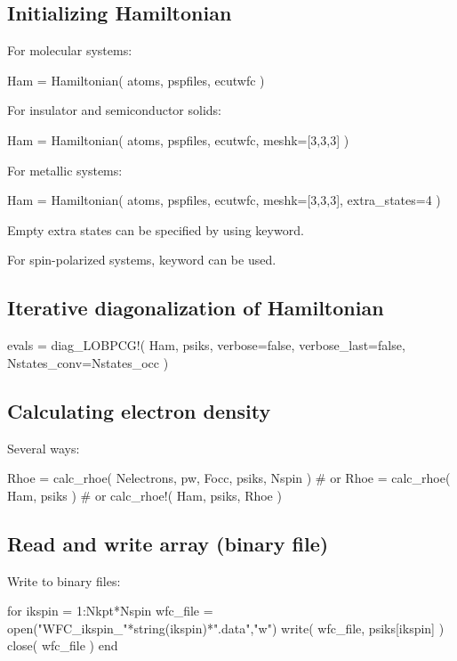 \subsection*{Initializing Hamiltonian}

For molecular systems:
\begin{juliacode}
Ham = Hamiltonian( atoms, pspfiles, ecutwfc )
\end{juliacode}

For insulator and semiconductor solids:
\begin{juliacode}
Ham = Hamiltonian( atoms, pspfiles, ecutwfc, meshk=[3,3,3] )
\end{juliacode}

For metallic systems:
\begin{juliacode}
Ham = Hamiltonian( atoms, pspfiles, ecutwfc, meshk=[3,3,3], extra_states=4 )
\end{juliacode}

Empty extra states can be specified by using  keyword.

For spin-polarized systems,  keyword can be used.


\subsection*{Iterative diagonalization of Hamiltonian}

\begin{juliacode}
evals =  diag_LOBPCG!( Ham, psiks, verbose=false, verbose_last=false,
                       Nstates_conv=Nstates_occ )
\end{juliacode}


\subsection*{Calculating electron density}

Several ways:
\begin{juliacode}
Rhoe = calc_rhoe( Nelectrons, pw, Focc, psiks, Nspin )
# or
Rhoe = calc_rhoe( Ham, psiks )
# or
calc_rhoe!( Ham, psiks, Rhoe )
\end{juliacode}

\subsection*{Read and write array (binary file)}

Write to binary files:
\begin{juliacode}
for ikspin = 1:Nkpt*Nspin
    wfc_file = open("WFC_ikspin_"*string(ikspin)*".data","w")
    write( wfc_file, psiks[ikspin] )
    close( wfc_file )
end
\end{juliacode}

